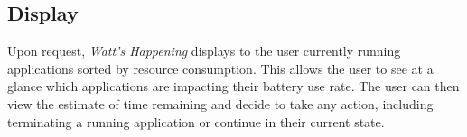 \subsection{Display} %
Upon request, \emph{Watt's Happening} displays to the user currently running applications sorted by resource consumption.
This allows the user to see at a glance which applications are impacting their battery use rate. %
The user can then view the estimate of time remaining and decide to take any action, including terminating a running application or continue in their current state.
